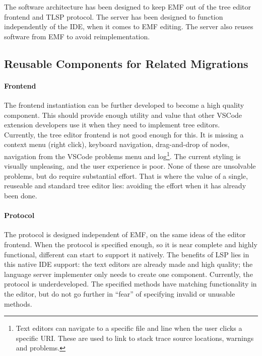 
The software architecture has been designed to keep \acrshort{EMF} out of the tree editor frontend and \acrshort{TLSP} protocol.
The server has been designed to function independently of the \acrshort{IDE}, when it comes to \acrshort{EMF} editing.
The server also reuses software from \acrshort{EMF} to avoid reimplementation.\\

\subsection{Reusable Components for Related Migrations}

\paragraph{Frontend}
The frontend instantiation can be further developed to become a high quality component.
This should provide enough utility and value that other \gls{VSCode} extension developers use it when they need to implement tree editors.\\
Currently, the tree editor frontend is not good enough for this.
It is missing a context menu (right click), keyboard navigation, drag-and-drop of nodes, navigation from the \gls{VSCode} problems menu and log\footnote{Text editors can navigate to a specific file and line when the user clicks a specific URI. These are used to link to stack trace source locations, warnings and problems.}.
The current styling is visually unpleasing, and the user experience is poor.
None of these are unsolvable problems, but do require substantial effort.
That is where the value of a single, reuseable and standard tree editor lies: avoiding the effort when it has already been done.

\paragraph{Protocol}
The protocol is designed independent of \acrshort{EMF}, on the same ideas of the editor frontend.
When the protocol is specified enough, so it is near complete and highly functional, different  can start to support it natively.
The benefits of \acrshort{LSP} lies in this native \acrshort{IDE} support: the text editors are already made and high quality; the language server implementer only needs to create one component.
Currently, the protocol is underdeveloped.
The specified methods have matching functionality in the editor, but do not go further in ``fear'' of specifying invalid or unusable methods.\\

